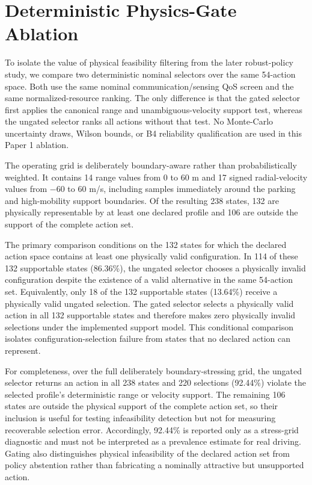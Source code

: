 \section{Deterministic Physics-Gate Ablation}
To isolate the value of physical feasibility filtering from the later robust-policy study, we compare two deterministic nominal selectors over the same 54-action space. Both use the same nominal communication/sensing QoS screen and the same normalized-resource ranking. The only difference is that the gated selector first applies the canonical range and unambiguous-velocity support test, whereas the ungated selector ranks all actions without that test. No Monte-Carlo uncertainty draws, Wilson bounds, or B4 reliability qualification are used in this Paper 1 ablation.

The operating grid is deliberately boundary-aware rather than probabilistically weighted. It contains 14 range values from 0 to 60 m and 17 signed radial-velocity values from $-60$ to $60$ m/s, including samples immediately around the parking and high-mobility support boundaries. Of the resulting 238 states, 132 are physically representable by at least one declared profile and 106 are outside the support of the complete action set.



The primary comparison conditions on the 132 states for which the declared action space contains at least one physically valid configuration. In 114 of these 132 supportable states (86.36\%), the ungated selector chooses a physically invalid configuration despite the existence of a valid alternative in the same 54-action set. Equivalently, only 18 of the 132 supportable states (13.64\%) receive a physically valid ungated selection. The gated selector selects a physically valid action in all 132 supportable states and therefore makes zero physically invalid selections under the implemented support model. This conditional comparison isolates configuration-selection failure from states that no declared action can represent.

For completeness, over the full deliberately boundary-stressing grid, the ungated selector returns an action in all 238 states and 220 selections (92.44\%) violate the selected profile's deterministic range or velocity support. The remaining 106 states are outside the physical support of the complete action set, so their inclusion is useful for testing infeasibility detection but not for measuring recoverable selection error. Accordingly, 92.44\% is reported only as a stress-grid diagnostic and must not be interpreted as a prevalence estimate for real driving. Gating also distinguishes physical infeasibility of the declared action set from policy abstention rather than fabricating a nominally attractive but unsupported action.

